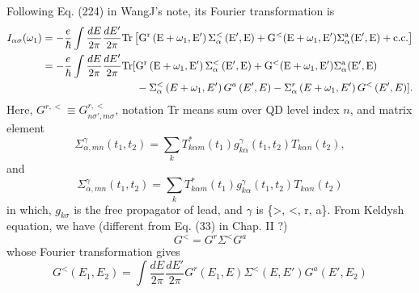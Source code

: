 \documentclass[11pt,a4paper]{article}
\begin{document}
Following Eq. (224) in WangJ's note, its Fourier transformation is
\begin{equation}
\begin{split}
I_{\alpha\sigma}(\omega_{1})&=-\frac{e}{\hbar}\int \frac{d E}{2 \pi} \frac{d E^{\prime}}{2 \pi} \rm{Tr}\left[G^{r}\left(E+\omega_{1}, E^{\prime}\right) \Sigma_{\alpha}^{<}\left(E^{\prime}, E\right) + G^{<}(E+\omega_{1}, E')\Sigma_{\alpha}^{a}(E', E) + c.c.\right]\\
&=-\frac{e}{\hbar}\int \frac{d E}{2 \pi} \frac{d E^{\prime}}{2 \pi} \rm{Tr} [ G^{r}\left(E+\omega_{1}, E^{\prime}\right) \Sigma_{\alpha}^{<}\left(E^{\prime}, E\right) + G^{<}(E+\omega_{1}, E')\Sigma_{\alpha}^{a}(E', E) \\
& \qquad \qquad \qquad\qquad\quad  -\Sigma_{\alpha}^{<}\left(E+\omega_{1}, E'\right) G^{a}\left(E', E\right)-\Sigma_{\alpha}^{r}\left(E+\omega_{1}, E'\right) G^{<} \left(E', E\right) ] .
\end{split}
\label{eq:current3}
\end{equation}
Here, $G^{r,<} \equiv G_{n\sigma',m\sigma}^{r,<}$, notation Tr means sum over QD level index $n$, and matrix element
\begin{equation}
\Sigma_{\alpha,mn}^{\gamma}(t_{1}, t_{2}) = \sum_{k} T_{k\alpha m}^{*}(t_{1}) g_{k\alpha}^{\gamma}(t_{1}, t_{2}) T_{k\alpha n}(t_{2}),
\label{eq:sigma}
\end{equation}
and
\begin{equation}
\Sigma_{\alpha, m n}^{\gamma}\left(t_{1}, t_{2}\right)=\sum_{k} T_{k \alpha m}^{*}\left(t_{1}\right) g_{k \alpha}^{\gamma}\left(t_{1}, t_{2}\right) T_{k \alpha n}\left(t_{2}\right)
\end{equation}
in which, $g_{k\sigma}$ is the free propagator of lead, and $\gamma$ is \{>, <, r, a\}. From Keldysh equation, we have (different from Eq. (33) in Chap. II ?)
\begin{equation}
G^{<}=G^{r} \Sigma^{<} G^{a}
\label{eq:r<a}
\end{equation}
whose Fourier transformation gives
\begin{equation}
G^{<}(E_{1},E_{2})=\int\frac{dE}{2\pi}\frac{dE'}{2\pi}G^{r}(E_{1}, E) \Sigma^{<}(E, E') G^{a}(E', E_{2})
\end{equation}
\end{document}
